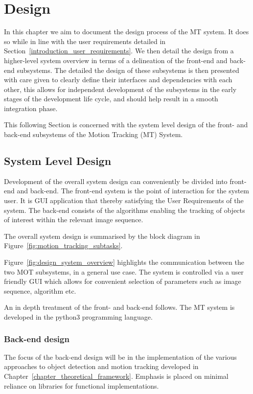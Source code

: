 \chapter{Design}\label{chapter_design}
In this chapter we aim to document the design process of the MT system. It does so
while in line with the user requirements detailed in 
Section~\ref{introduction_user_requirements}. 
We then detail the design from a higher-level system overview in terms of a
delineation of the front-end and back-end subsystems. The detailed the design of
these subsystems is then presented with care given to clearly define their
interfaces and dependencies with each other, this allows for independent
development of the subsystems in the early stages of the development life cycle,
and should help result in a smooth integration phase.

This following Section is concerned with the system level design of the
front- and back-end subsystems of the Motion Tracking (MT) System.

\section{System Level Design}
Development of the overall system design can conveniently be divided into
front-end and back-end. The front-end system is the point of interaction for the
system user. It is GUI application that thereby satisfying the User Requirements
of the system. The back-end consists of the algorithms enabling the tracking of
objects of interest within the relevant image sequence.

The overall system design is summarised by the block diagram in
Figure~\ref{fig:motion_tracking_subtasks}.  


Figure~\ref{fig:design_system_overview} highlights the communication between the two MOT
subsystems, in a general use case. The system is controlled via a user
friendly GUI which allows for convenient selection of parameters such as
image sequence, algorithm etc.

An in depth treatment of the front- and back-end follows. The MT system is
developed in the python3 programming language. 

\subsection{Back-end design}\label{design_back_end}
The focus of the back-end design will be in the implementation of the various
approaches to object detection and motion tracking developed in
Chapter~\ref{chapter_theoretical_framework}.
Emphasis is placed on minimal reliance on libraries for functional
implementations.

